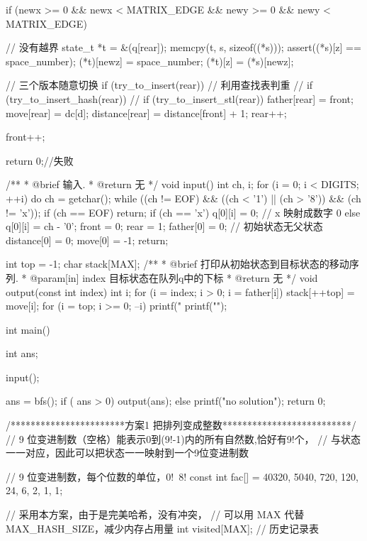 \begin{Codex}[label=eight_digits_bfs.c]
{{{            if (newx >= 0 && newx < MATRIX_EDGE && newy >= 0 &&
                newy < MATRIX_EDGE) { // 没有越界
                state_t *t = &(q[rear]);
                memcpy(t, s, sizeof((*s)));
                assert((*s)[z] == space_number);
                (*t)[newz] = space_number;
                (*t)[z] = (*s)[newz];

                // 三个版本随意切换
                if (try_to_insert(rear)) { // 利用查找表判重
                // if (try_to_insert_hash(rear)) {
                // if (try_to_insert_stl(rear)) {
                    father[rear] = front;
                    move[rear] = dc[d];
                    distance[rear] = distance[front] + 1;
                    rear++;
                } 
            }
        }

        front++;
    }

    return 0;//失败 
}


/**
 * @brief 输入.
 * @return 无
 */
void input() {
    int ch, i;
    for (i = 0; i < DIGITS; ++i) {
        do {
            ch = getchar();
        } while ((ch != EOF) && ((ch < '1') || (ch > '8')) && (ch != 'x'));
        if (ch == EOF) return;
        if (ch == 'x') q[0][i] = 0; // x 映射成数字 0
        else           q[0][i] = ch - '0';
    }
    front = 0; rear = 1;
    father[0] = 0; // 初始状态无父状态
    distance[0] = 0;
    move[0] = -1;
    return;
}

int top = -1;
char stack[MAX];
/**
 * @brief 打印从初始状态到目标状态的移动序列.
 * @param[in] index 目标状态在队列q中的下标
 * @return 无
 */
void output(const int index) {
    int i;
    for (i = index; i > 0; i = father[i]) {
        stack[++top] = move[i];
    }
    for (i = top; i >= 0; --i) {
        printf("%
    }
    printf("\n");
}

int main() {
    int ans;

    input();
    
    ans = bfs();
    if ( ans > 0) {
        output(ans);
    } else {
        printf("no solution\n");
    }
    return 0;
}

/***********************方案1 把排列变成整数**************************/
// 9 位变进制数（空格）能表示0到(9!-1)内的所有自然数,恰好有9!个，
// 与状态一一对应，因此可以把状态一一映射到一个9位变进制数

// 9 位变进制数，每个位数的单位，0!~8!
const int fac[] = {40320, 5040, 720, 120, 24, 6, 2, 1, 1};

// 采用本方案，由于是完美哈希，没有冲突，
// 可以用 MAX 代替 MAX_HASH_SIZE，减少内存占用量
int visited[MAX]; // 历史记录表

}}
\end{Codex}
